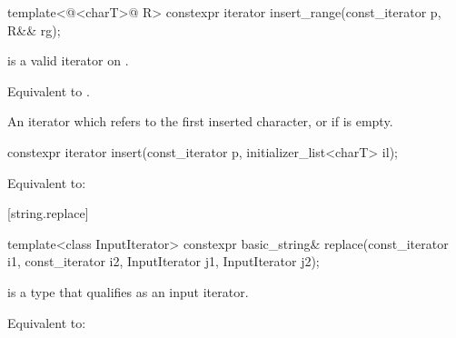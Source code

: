 \documentclass{wg21}
\begin{document}
\begin{addedblock}
\begin{itemdecl}
    template<@<charT>@ R>
    constexpr iterator insert_range(const_iterator p, R&& rg);
\end{itemdecl}

\begin{itemdescr}
     \pnum
    \expects
     is a valid iterator on .

    \pnum
    \effects
    Equivalent to
    .

    \pnum
    \returns
    An iterator which refers to the first inserted character, or
     if  is empty.
\end{itemdescr}
\end{addedblock}

%
\begin{itemdecl}
    constexpr iterator insert(const_iterator p, initializer_list<charT> il);
\end{itemdecl}
\begin{itemdescr}
    \pnum
    \effects Equivalent to: 
\end{itemdescr}

[string.replace]{}

%
\begin{itemdecl}
    template<class InputIterator>
    constexpr basic_string& replace(const_iterator i1, const_iterator i2,
    InputIterator j1, InputIterator j2);
\end{itemdecl}

\begin{itemdescr}
    \pnum
    \constraints
     is a type that qualifies as an input
    iterator.

    \pnum
    \effects
    Equivalent to: 
\end{itemdescr}
\end{document}
